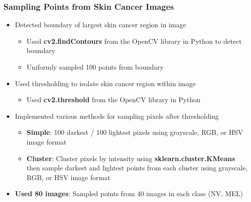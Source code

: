 \documentclass[aspectratio=169]{beamer}
\begin{document}
\begin{frame}
\frametitle{Sampling Points from Skin Cancer Images} %
\vspace*{-4mm}
\begin{itemize}\justifying
\item Detected boundary of largest skin cancer region in image
	\begin{itemize}\justifying
	\item Used {\bfseries \textcolor{UF_dark_blue}{cv2.findContours}} from the OpenCV library in Python to detect boundary
	\item Uniformly sampled 100 points from boundary
	\end{itemize}
\item Used thresholding to isolate skin cancer region within image
	\begin{itemize}\justifying
	\item Used {\bfseries \textcolor{UF_dark_blue}{cv2.threshold}} from the OpenCV library in Python
	\end{itemize}
\item Implemented various methods for sampling pixels after thresholding
	\begin{itemize} \justifying
	\item {\bfseries \textcolor{UF_dark_blue}{Simple}}: 100 darkest / 100 lightest pixels using grayscale, RGB, or HSV image format
	\item {\bfseries \textcolor{UF_dark_blue}{Cluster}}: Cluster pixels by intensity using {\bfseries \textcolor{UF_dark_blue}{sklearn.cluster.KMeans}} then sample darkest and lightest points from each cluster using grayscale, RGB, or HSV image format
	\end{itemize}
\item {\bfseries \textcolor{UF_dark_blue}{Used 80 images}}: Sampled points from 40 images in each class (NV, MEL)
\end{itemize}
\end{frame}
\end{document}
